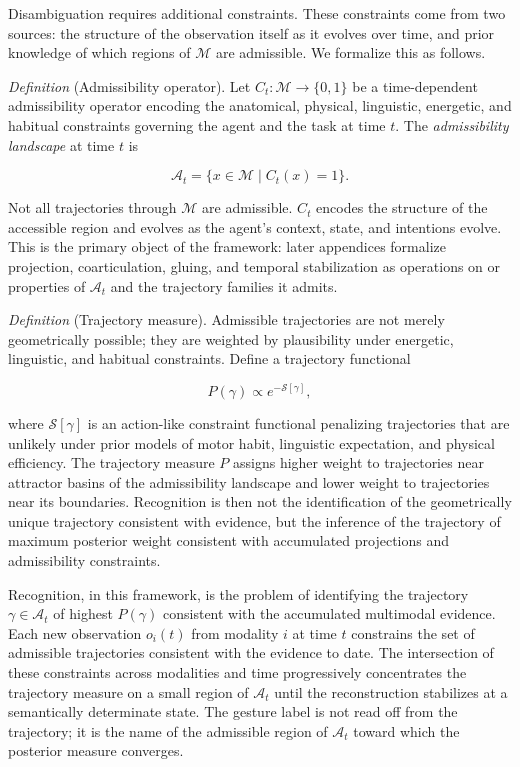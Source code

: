 \documentclass[11pt, a4paper]{article}
\theoremstyle{definition}
\begin{document}
Disambiguation requires additional constraints. These constraints come from two sources: the structure of the observation itself as it evolves over time, and prior knowledge of which regions of $\mathcal{M}$ are admissible. We formalize this as follows.

\textit{Definition} (Admissibility operator). Let $C_t : \mathcal{M} \to \{0,1\}$ be a time-dependent admissibility operator encoding the anatomical, physical, linguistic, energetic, and habitual constraints governing the agent and the task at time $t$. The \emph{admissibility landscape} at time $t$ is

\[
\mathcal{A}_t = \{x \in \mathcal{M} \mid C_t(x) = 1\}.
\]

Not all trajectories through $\mathcal{M}$ are admissible. $C_t$ encodes the structure of the accessible region and evolves as the agent's context, state, and intentions evolve. This is the primary object of the framework: later appendices formalize projection, coarticulation, gluing, and temporal stabilization as operations on or properties of $\mathcal{A}_t$ and the trajectory families it admits.

\textit{Definition} (Trajectory measure). Admissible trajectories are not merely geometrically possible; they are weighted by plausibility under energetic, linguistic, and habitual constraints. Define a trajectory functional

\[
P(\gamma) \propto e^{-\mathcal{S}[\gamma]},
\]

where $\mathcal{S}[\gamma]$ is an action-like constraint functional penalizing trajectories that are unlikely under prior models of motor habit, linguistic expectation, and physical efficiency. The trajectory measure $P$ assigns higher weight to trajectories near attractor basins of the admissibility landscape and lower weight to trajectories near its boundaries. Recognition is then not the identification of the geometrically unique trajectory consistent with evidence, but the inference of the trajectory of maximum posterior weight consistent with accumulated projections and admissibility constraints.

Recognition, in this framework, is the problem of identifying the trajectory $\gamma \in \mathcal{A}_t$ of highest $P(\gamma)$ consistent with the accumulated multimodal evidence. Each new observation $o_i(t)$ from modality $i$ at time $t$ constrains the set of admissible trajectories consistent with the evidence to date. The intersection of these constraints across modalities and time progressively concentrates the trajectory measure on a small region of $\mathcal{A}_t$ until the reconstruction stabilizes at a semantically determinate state. The gesture label is not read off from the trajectory; it is the name of the admissible region of $\mathcal{A}_t$ toward which the posterior measure converges.
\end{document}
